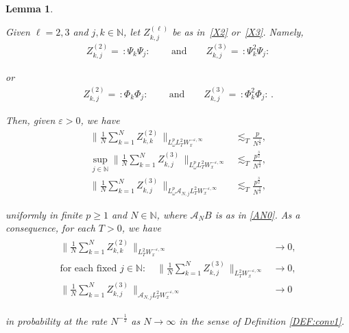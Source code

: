 \documentclass[letterpaper, 11pt,  reqno]{amsart}
\newtheorem{lemma}[theorem]{Lemma}
\newcommand{\1}{\hspace{0.5mm}\text{I}\hspace{0.2mm}}
\newcommand{\noi}{\noindent}
\newcommand{\N}{\mathbb{N}}
\newcommand{\eps}{\varepsilon}
\newcommand{\les}{\lesssim}
\newcommand{\A}{\mathcal{A}}
\newcommand{\wick}[1]{:\!{#1}\!:}
\newcommand{\too}{\longrightarrow}
\renewcommand{\o}{\omega}
\renewcommand{\l}{\ell}
\numberwithin{equation}{section}
\numberwithin{theorem}{section}
\begin{document}
\begin{lemma}
\label{LEM:LLN1}


Given $\l = 2, 3$ and $j, k \in \N$, 
let $Z^{(\l)}_{k, j}$
be as in~\eqref{X2} or~\eqref{X3}.
Namely, 
\begin{align}
  Z_{k, j}^{(2)} = \, \wick{\Psi_k \Psi_j} \,  
\qquad \text{and}\qquad 
Z_{k, j}^{(3)}
=  \, \wick{\Psi_k^2 \Psi_j} 
\label{LN1}
\end{align}

\noi
or 
\begin{align}
   Z_{k, j}^{(2)} = \, \wick{\Phi_k \Phi_j} \, 
\qquad \text{and}\qquad 
Z_{k, j}^{(3)}
=  \, \wick{\Phi_k^2 \Phi_j}\,.
\label{LN2}
\end{align}


\noi
Then, 
given $\eps > 0$, we have 
\begin{align}
 \bigg\| \frac{1}{N} \sum_{k = 1}^N 
Z_{k, k}^{(2)}\, \bigg\|_{L^p_\o L_T^2 W_x^{- \eps, \infty}}
& \les_T \frac{p}{N^{\frac 12}} , 
\label{LN3} \\
\sup_{j \in \N}
 \bigg\| \frac 1N \sum_{k = 1}^N 
 Z_{k, j}^{(3)}\, \bigg\|_{L^p_\o L_T^2 W_x^{- \eps, \infty}}
& \les_T \frac{p^{\frac 32} }{N^{\frac 12}} , 
\label{LN4} \\
 \bigg\| \frac 1N \sum_{k = 1}^N 
 Z_{k, j}^{(3)}\, \bigg\|_{L^p_\o \A_{N, j}L_T^2 W_x^{- \eps, \infty}}
& \les_T \frac{p^{\frac 32} }{N^{\frac 12}} , 
\label{LN5}
\end{align}

\noi
uniformly in finite $p \ge 1$ and $N \in \N$, 
where $\A_N B$ is as in \eqref{AN0}.
As a consequence,
for each $T > 0$, we have 
\begin{align}
\begin{split}
 \bigg\| \frac{1}{N} \sum_{k = 1}^N 
Z_{k, k}^{(2)}\, \bigg\|_{ L_T^2 W_x^{- \eps, \infty}}
& \too 0 , \\
\text{for each fixed $j \in \N:$}
\quad 
  \bigg\| \frac 1N \sum_{k = 1}^N 
 Z_{k, j}^{(3)}\, \bigg\|_{ L_T^2 W_x^{- \eps, \infty}}
& \too 0 , \\
  \bigg\| \frac 1N \sum_{k = 1}^N 
 Z_{k, j}^{(3)}\, \bigg\|_{ \A_{N, j}L_T^2 W_x^{- \eps, \infty}}
& \too 0
\end{split}
\label{LN5a}
\end{align}

\noi
in probability
at the rate $N^{-\frac 12 }$
as $N \to \infty$
in the sense of Definition \ref{DEF:conv1}.


\end{lemma}
\end{document}
